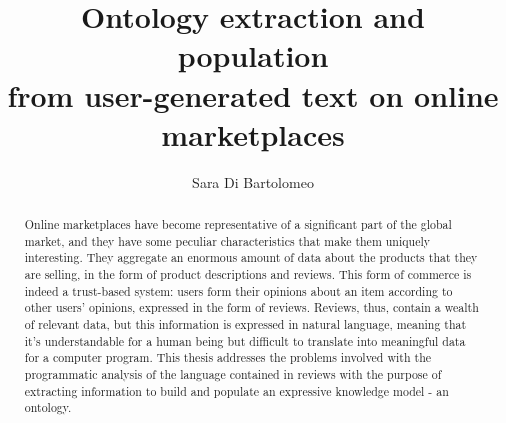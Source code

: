 \documentclass[LaM,oneside,binding=0.6cm]{sapthesis}
\title{Ontology extraction and population \\ from user-generated text on online marketplaces}
\author{Sara Di Bartolomeo}
\begin{document}
\frontmatter

\maketitle

\dedication{Dedicato a\\ Nonno Lamberto}

\begin{abstract}

Online marketplaces have become representative of a significant part of the global market, and they have some peculiar characteristics that make them uniquely interesting. They aggregate an enormous amount of data about the products that they are selling, in the form of product descriptions and reviews. This form of commerce is indeed a trust-based system: users form their opinions about an item according to other users' opinions, expressed in the form of reviews. Reviews, thus, contain a wealth of relevant data, but this information is expressed in natural language, meaning that it's understandable for a human being but difficult to translate into meaningful data for a computer program. This thesis addresses the problems involved with the programmatic analysis of the language contained in reviews with the purpose of extracting information to build and populate an expressive knowledge model - an ontology.

\end{abstract}
\end{document}
